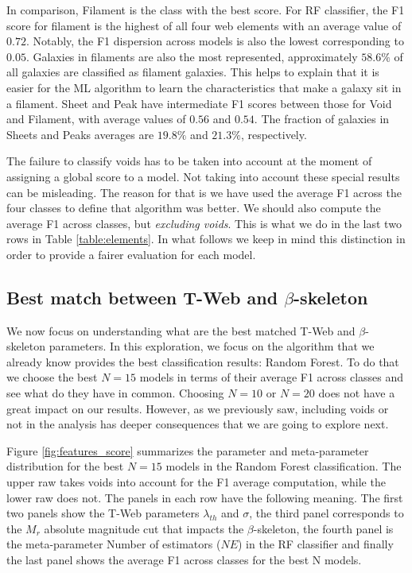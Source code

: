 \documentclass[usenatbib]{mnras}
\begin{document}
In comparison, Filament is the class with the best score.
For RF classifier, the F1 score for filament is the highest of all four
web elements with an average value of  $0.72$.
Notably, the F1 dispersion across models is also the lowest
corresponding to $0.05$.
Galaxies in filaments are also the most represented,
approximately $58.6\%$ of all galaxies are classified as filament galaxies.
This helps to explain that it is easier for the ML algorithm to learn
the characteristics that make a galaxy sit in a filament.
Sheet and Peak have intermediate F1 scores between
those for Void and Filament, with average values of $0.56$ and $0.54$.
The fraction of galaxies in Sheets and Peaks averages are $19.8\%$ and $21.3\%$, respectively. 

The failure to classify voids has to be taken into account at the
moment of assigning a global score to a model.
Not taking into account these special results can be misleading.
The reason for that is we have used the average F1 across the
four classes to define that algorithm was better. 
We should also compute the average F1 across classes, but
\emph{excluding voids}.
This is what we do in the last two rows in Table \ref{table:elements}.
In what follows we keep in mind this distinction in order to provide a
fairer evaluation for each model.


\subsection{Best match between T-Web and $\beta$-skeleton}

We now focus on understanding what are the best matched T-Web and
$\beta$-skeleton parameters.
In this exploration, we focus on the algorithm that we already know
provides the best classification results: Random Forest. 
To do that we choose the best $N=15$ models in terms of their average F1 across
classes and see what do they have in common.
Choosing $N=10$ or $N=20$ does not have a great impact on our
results. 
However, as we previously saw, including voids or not in the analysis
has deeper consequences that we are going to explore next.

Figure \ref{fig:features_score} summarizes the parameter and meta-parameter
distribution for the best $N=15$ models in the Random Forest
classification.
The upper raw takes voids into account for the F1 average computation,
while the lower raw does not.
The panels in each row have the following meaning.
The first two panels show the T-Web parameters
$\lambda_{th}$ and $\sigma$, the third panel corresponds to the $M_r$
absolute magnitude cut that impacts the $\beta$-skeleton, the fourth panel is the meta-parameter Number of estimators ($NE$) in the RF
classifier and finally the last panel shows the average F1 across classes for the best N models. 
\end{document}
